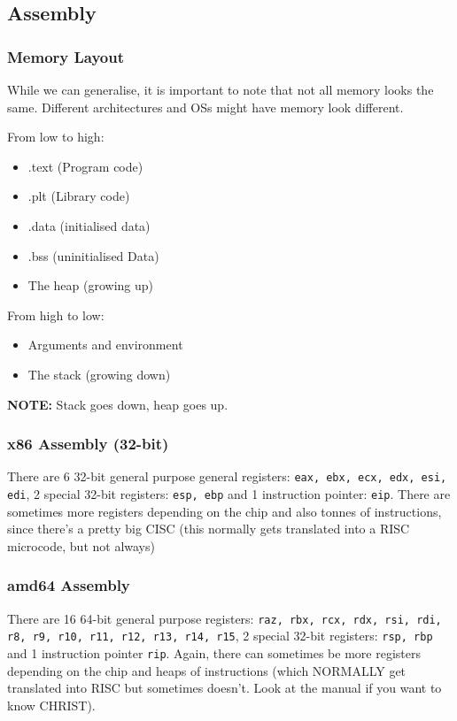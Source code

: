 \documentclass[11pt,a4paper,titlepage,dvipsnames,cmyk]{scrartcl}
\begin{document}
\subsection{Assembly}

\subsubsection{Memory Layout}
While we can generalise, it is important to note that not all memory looks the same. Different architectures and OSs might have memory look different.

From low to high:
\begin{itemize}
    \item .text (Program code)
    \item .plt (Library code)
    \item .data (initialised data)
    \item .bss (uninitialised Data)
    \item The heap (growing up)
\end{itemize}

From high to low:
\begin{itemize}
    \item Arguments and environment
    \item The stack (growing down)
\end{itemize}

\begin{tcolorbox}
\textbf{NOTE:} Stack goes down, heap goes up.
\end{tcolorbox}

\subsubsection{x86 Assembly (32-bit)}
There are 6 32-bit general purpose general registers: \texttt{eax, ebx, ecx, edx, esi, edi}, 2 special 32-bit registers: \texttt{esp, ebp} and 1 instruction pointer: \texttt{eip}. There are sometimes more registers depending on the chip and also tonnes of instructions, since there's a pretty big CISC (this normally gets translated into a RISC microcode, but not always)

\subsubsection{amd64 Assembly}
There are 16 64-bit general purpose registers: \texttt{raz, rbx, rcx, rdx, rsi, rdi, r8, r9, r10, r11, r12, r13, r14, r15}, 2 special 32-bit registers: \texttt{rsp, rbp} and 1 instruction pointer \texttt{rip}. Again, there can sometimes be more registers depending on the chip and heaps of instructions (which NORMALLY get translated into RISC but sometimes doesn't. Look at the manual if you want to know CHRIST).
\end{document}
